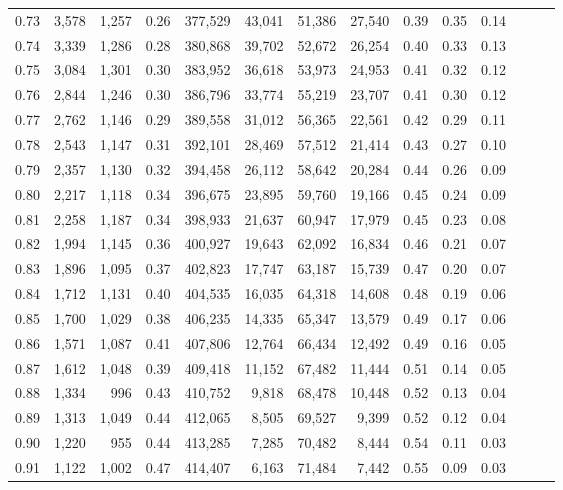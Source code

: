 \begin{tabular}{rrrrrrrrrrrrrr}
0.73 &  3,578 &  1,257 &  0.26 &  377,529 &   43,041 &  51,386 &  27,540 &  0.39 &  0.35 &      0.14 \\
0.74 &  3,339 &  1,286 &  0.28 &  380,868 &   39,702 &  52,672 &  26,254 &  0.40 &  0.33 &      0.13 \\
0.75 &  3,084 &  1,301 &  0.30 &  383,952 &   36,618 &  53,973 &  24,953 &  0.41 &  0.32 &      0.12 \\
0.76 &  2,844 &  1,246 &  0.30 &  386,796 &   33,774 &  55,219 &  23,707 &  0.41 &  0.30 &      0.12 \\
0.77 &  2,762 &  1,146 &  0.29 &  389,558 &   31,012 &  56,365 &  22,561 &  0.42 &  0.29 &      0.11 \\
0.78 &  2,543 &  1,147 &  0.31 &  392,101 &   28,469 &  57,512 &  21,414 &  0.43 &  0.27 &      0.10 \\
0.79 &  2,357 &  1,130 &  0.32 &  394,458 &   26,112 &  58,642 &  20,284 &  0.44 &  0.26 &      0.09 \\
0.80 &  2,217 &  1,118 &  0.34 &  396,675 &   23,895 &  59,760 &  19,166 &  0.45 &  0.24 &      0.09 \\
0.81 &  2,258 &  1,187 &  0.34 &  398,933 &   21,637 &  60,947 &  17,979 &  0.45 &  0.23 &      0.08 \\
0.82 &  1,994 &  1,145 &  0.36 &  400,927 &   19,643 &  62,092 &  16,834 &  0.46 &  0.21 &      0.07 \\
0.83 &  1,896 &  1,095 &  0.37 &  402,823 &   17,747 &  63,187 &  15,739 &  0.47 &  0.20 &      0.07 \\
0.84 &  1,712 &  1,131 &  0.40 &  404,535 &   16,035 &  64,318 &  14,608 &  0.48 &  0.19 &      0.06 \\
0.85 &  1,700 &  1,029 &  0.38 &  406,235 &   14,335 &  65,347 &  13,579 &  0.49 &  0.17 &      0.06 \\
0.86 &  1,571 &  1,087 &  0.41 &  407,806 &   12,764 &  66,434 &  12,492 &  0.49 &  0.16 &      0.05 \\
0.87 &  1,612 &  1,048 &  0.39 &  409,418 &   11,152 &  67,482 &  11,444 &  0.51 &  0.14 &      0.05 \\
0.88 &  1,334 &    996 &  0.43 &  410,752 &    9,818 &  68,478 &  10,448 &  0.52 &  0.13 &      0.04 \\
0.89 &  1,313 &  1,049 &  0.44 &  412,065 &    8,505 &  69,527 &   9,399 &  0.52 &  0.12 &      0.04 \\
0.90 &  1,220 &    955 &  0.44 &  413,285 &    7,285 &  70,482 &   8,444 &  0.54 &  0.11 &      0.03 \\
0.91 &  1,122 &  1,002 &  0.47 &  414,407 &    6,163 &  71,484 &   7,442 &  0.55 &  0.09 &      0.03 \\

\end{tabular}
